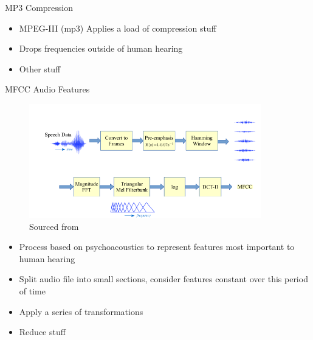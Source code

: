 \documentclass[notes]{beamer}
\begin{document}

\begin{frame}{MP3 Compression}
\begin{itemize}
	\item MPEG-III (mp3) Applies a load of compression stuff
	\item Drops frequencies outside of human hearing
	\item Other stuff
\end{itemize}
\end{frame}


\begin{frame}{MFCC Audio Features}
\begin{minipage}{0.45\textwidth}
	\centering
	\begin{figure}
		\includegraphics[width=0.9\textwidth]{figures/MFCC_process}
		\caption{Sourced from}
	\end{figure}
	
\end{minipage}\hfill
\begin{minipage}{0.45\textwidth}
\begin{itemize}
	\item Process based on psychoacoustics to represent features most important to human hearing
	\item Split audio file into small sections, consider features constant over this period of time
	\item Apply a series of transformations
	\item Reduce stuff
\end{itemize}
\end{minipage}\hfill
\end{frame}
\end{document}
